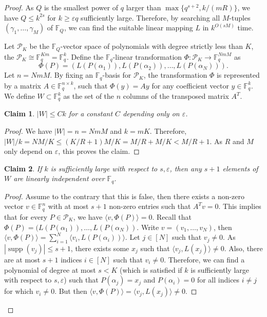 \documentclass[10pt,a4paper]{amsart}
\newtheorem{claim}{Claim}
\DeclareMathOperator{\supp}{supp}
\begin{document}
\begin{proof}
As $Q$ is the smallest power of $q$ larger than $\max\{q^{s+2},k/(mR)\}$, we have $Q\leq k^{2s}$ for $k\geq \varepsilon q$ sufficiently large. Therefore, by searching all $M$-tuples $(\gamma_1,\dots,\gamma_M)$ of $\mathbb{F}_Q$, we can find the suitable linear mapping $L$ in $k^{O(sM)}$ time.


Let $\mathcal{P}_K$ be the $\mathbb{F}_Q$-vector space of polynomials with degree strictly less than $K$, the $\mathcal{P}_K\cong \mathbb{F}_q^{Km}=\mathbb{F}_q^k$. Define the $\mathbb{F}_q$-linear transformation $\Phi : \mathcal{P}_K \to \mathbb{F}_q^{NmM}$ as $$\Phi(P) = \left( L(P(\alpha_1)), L(P(\alpha_2)), \dots, L(P(\alpha_N)) \right).$$
Let $n = NmM$. By fixing an $\mathbb{F}_q$-basis for $\mathcal{P}_K$, the transformation $\Phi$ is represented by a matrix $A \in \mathbb{F}_q^{n \times k}$, such that $\Phi(y) = Ay$ for any coefficient vector $y \in \mathbb{F}_q^k$. We define $W \subset \mathbb{F}_q^k$ as the set of the $n$ columns of the transposed matrix $A^T$.

\begin{claim}
$|W| \le Ck$ for a constant $C$ depending only on $\varepsilon$.
\end{claim}

\begin{proof} We have $|W| = n = NmM$ and $k=mK$. Therefore, $|W|/k=NM/K\leq (K/R+1)M/K=M/R+M/K<M/R+1$. As $R$ and $M$ only depend on $\varepsilon$, this proves the claim.
\end{proof}

\begin{claim}
 If $k$ is sufficiently large with respect to $s,\varepsilon$, then any $s+1$ elements of $W$ are linearly independent over $\mathbb{F}_q$.
 \end{claim}
 
 \begin{proof} Assume to the contrary that this is false, then there exists a non-zero vector $v \in \mathbb{F}_q^n$ with at most $s+1$ non-zero entries such that $A^T v = 0$. This implies that for every $P\in \mathcal{P}_K$, we have $\langle v,\Phi(P)\rangle=0$. Recall that $\Phi(P)=(L(P(\alpha_1)),\dots,L(P(\alpha_N))$. Write $v=(v_1,\dots,v_N)$, then 
$\langle v,\Phi(P)\rangle=\sum_{i=1}^N \langle v_i,L(P(\alpha_i))\rangle$.
Let $j\in [N]$ such that $v_j\neq 0$. As $|\supp(v_j)|\leq s+1$, there exists some $x_j$ such that $\langle v_j,L(x_j)\rangle\neq 0$. Also, there are at most $s+1$ indices $i\in [N]$ such that $v_i\neq 0$. Therefore, we can find a polynomial of degree at most $s < K$ (which is satisfied if  $k$ is sufficiently large with respect to $s,\varepsilon$) such that $P(\alpha_j)=x_j$ and $P(\alpha_i)=0$ for all indices $i\neq j$ for which $v_i \neq 0$. But then $\langle v,\Phi(P)\rangle=\langle v_j,L(x_j)\rangle\neq 0$.
 \end{proof}
 

\end{proof}
\end{document}
